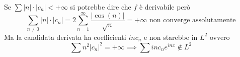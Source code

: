 Se $\sum |n| \cdot |c_n| < +\infty$ si potrebbe dire che $f$ è derivabile però
$$
\sum_{n \neq 0} |n| \cdot |c_n| = 2 \sum_{n=1}^\infty \frac{|\cos(n)|}{\sqrt{n}} = +\infty
\text{ non converge assolutamente}
$$
Ma la candidata derivata ha coefficienti $i n c_n$ e non starebbe in $L^2$ ovvero
$$
\sum n^2 |c_n|^2 = +\infty \implies \sum i n c_n e^{inx} \notin L^2
$$


















